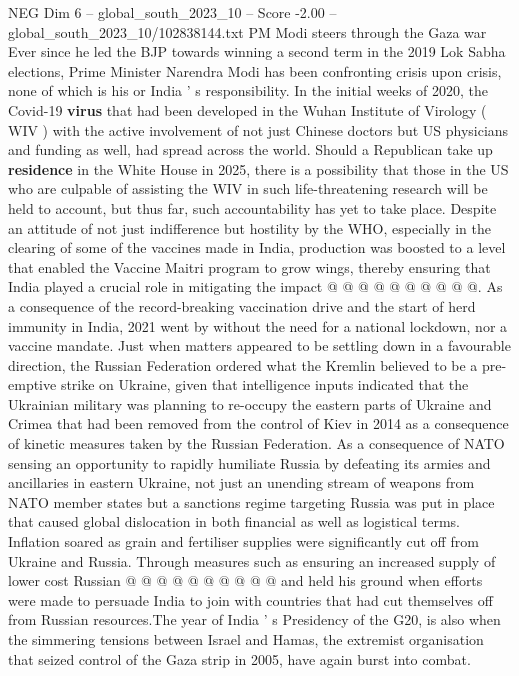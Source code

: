 \begin{textsample}{NEG Dim 6 – global\_south\_2023\_10 – Score -2.00 – global\_south\_2023\_10/102838144.txt}  \label{ex:f6_neg_207}
PM Modi steers through the Gaza war Ever since he led the BJP towards winning a second term in the 2019 Lok Sabha elections, Prime Minister Narendra Modi has been confronting crisis upon crisis, none of which is his or India ' s responsibility.
In the initial weeks of 2020, the Covid-19 \textbf{virus} that had been developed in the Wuhan Institute of Virology ( WIV ) with the active involvement of not just Chinese doctors but US physicians and funding as well, had spread across the world.
Should a Republican take up \textbf{residence} in the White House in 2025, there is a possibility that those in the US who are culpable of assisting the WIV in such life-threatening research will be held to account, but thus far, such accountability has yet to take place.
Despite an attitude of not just indifference but hostility by the WHO, especially in the clearing of some of the vaccines made in India, production was boosted to a level that enabled the Vaccine Maitri program to grow wings, thereby ensuring that India played a crucial role in mitigating the impact @ @ @ @ @ @ @ @ @ @.
As a consequence of the record-breaking vaccination drive and the start of herd immunity in India, 2021 went by without the need for a national lockdown, nor a vaccine mandate.
Just when matters appeared to be settling down in a favourable direction, the Russian Federation ordered what the Kremlin believed to be a pre-emptive strike on Ukraine, given that intelligence inputs indicated that the Ukrainian military was planning to re-occupy the eastern parts of Ukraine and Crimea that had been removed from the control of Kiev in 2014 as a consequence of kinetic measures taken by the Russian Federation.
As a consequence of NATO sensing an opportunity to rapidly humiliate Russia by defeating its armies and ancillaries in eastern Ukraine, not just an unending stream of weapons from NATO member states but a sanctions regime targeting Russia was put in place that caused global dislocation in both financial as well as logistical terms.
Inflation soared as grain and fertiliser supplies were significantly cut off from Ukraine and Russia.
Through measures such as ensuring an increased supply of lower cost Russian @ @ @ @ @ @ @ @ @ @ and held his ground when efforts were made to persuade India to join with countries that had cut themselves off from Russian resources.The year of India ' s Presidency of the G20, is also when the simmering tensions between Israel and Hamas, the extremist organisation that seized control of the Gaza strip in 2005, have again burst into combat.

\end{textsample}
